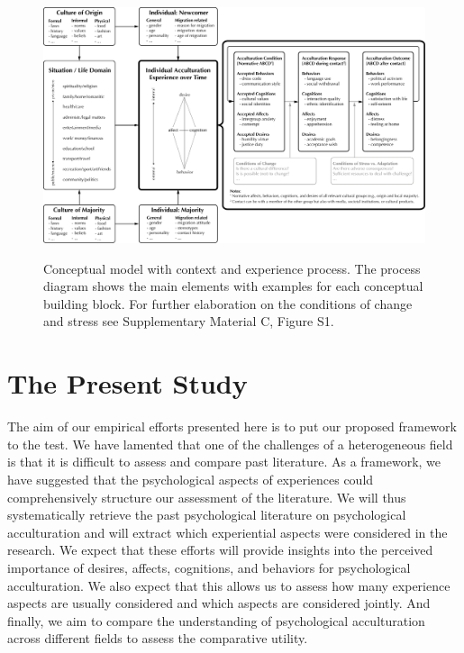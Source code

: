 \documentclass[man, 12pt, a4paper, mask]{apa7}
\newcommand\Warning[1][2ex]{%
  \renewcommand\stacktype{L}%
  \scaleto{\stackon[1.3pt]{\color{red}$\triangle$}{\tiny\bfseries !}}{#1}}%
\begin{document}

\begin{figure}
    \centering
    \caption{Conceptual model with context and experience process. The process diagram shows the main elements with examples for each conceptual building block. For further elaboration on the conditions of change and stress see Supplementary Material C, Figure S1.}
    \includegraphics[width=\textwidth]{Figures/ConceptualFrameworkExpandedOptima_short.pdf}
    \label{fig:ModelContext}
\end{figure}

\section{The Present Study}


The aim of our empirical efforts presented here is to put our proposed framework to the test. We have lamented that one of the challenges of a heterogeneous field is that it is difficult to assess and compare past literature. As a framework, we have suggested that the psychological aspects of experiences could comprehensively structure our assessment of the literature. We will thus systematically retrieve the past psychological literature on psychological acculturation and will extract which experiential aspects were considered in the research. We expect that these efforts will provide insights into the perceived importance of desires, affects, cognitions, and behaviors for psychological acculturation. We also expect that this allows us to assess how many experience aspects are usually considered and which aspects are considered jointly. And finally, we aim to compare the understanding of psychological acculturation across different fields to assess the comparative utility. 
\end{document}
